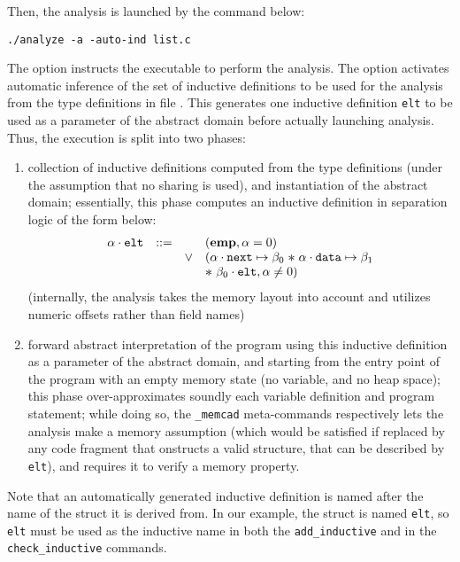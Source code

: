 Then, the analysis is launched by the command below:
\begin{verbatim}
./analyze -a -auto-ind list.c
\end{verbatim}
The  option instructs the executable to perform the analysis.
The  option activates automatic inference of the set
of inductive definitions to be used for the analysis from the type
definitions in file .
This generates one inductive definition \verb#elt# to be used as a
parameter of the abstract domain before actually launching analysis.
Thus, the execution is split into two phases:
\begin{enumerate}
\item collection of inductive definitions computed from the type
  definitions (under the assumption that no sharing is used), and
  instantiation of the abstract domain;
  essentially, this phase computes an inductive definition in separation
  logic of the form below:
  \[
  \begin{array}{lccl}
    \icallpz{\alpha}{\indelt}
    & ::= & & (\emp, \alpha = 0) \\
    & & \logor &
    (\alpha \cdot \fldnext \relpt{} \beta_0
    \lsep \alpha \cdot \flddata \relpt{} \beta_1 \\
    & & & \lsep \icallpz{\beta_0}{\indelt}, \alpha \not= 0) \\
  \end{array}
  \]
  (internally, the analysis takes the memory layout into account
  and utilizes numeric offsets rather than field names)
\item forward abstract interpretation of the program using this
  inductive definition as a parameter of the abstract domain, and
  starting from the entry point of the program with an empty memory
  state (no variable, and no heap space);
  this phase over-approximates soundly each variable definition and
  program statement;
  while doing so, the \verb#_memcad# meta-commands respectively
  lets the analysis make a memory assumption (which would be satisfied
  if replaced by any code fragment that onstructs a valid structure,
  that can be described by \verb#elt#), and requires it to verify
  a memory property.
\end{enumerate}
Note that an automatically generated inductive definition is named
after the name of the struct it is derived from.
In our example, the struct is named \verb#elt#, so \verb#elt# must
be used as the inductive name in both the \verb#add_inductive# and
in the \verb#check_inductive# \memcad commands.

